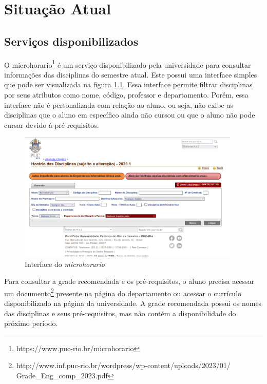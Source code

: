 
\chapter{Situa{\c c}\~ao Atual}
\label{cha:Situa{\c c}\~ao Atual}

\section{Serviços disponibilizados}

O microhorario\footnote{https://www.puc-rio.br/microhorario} é um serviço disponibilizado pela universidade para consultar informações das disciplinas do semestre atual. Este possui uma interface simples que pode ser visualizada na figura \ref{fig:microhorario}. Essa interface permite filtrar disciplinas por seus atributos como nome, código, professor e departamento. Porém, essa interface não é personalizada com relação ao aluno, ou seja, não exibe as disciplinas que o aluno em específico ainda não cursou ou que o aluno não pode cursar devido à pré-requisitos.

\begin{figure}[h]
    \begin{center}
    \includegraphics[width=300pt]{figuras/microhorario}
    \caption{Interface do \textit{microhorario}}
    \label{fig:microhorario}
    \end{center}
\end{figure}

Para consultar a grade recomendada e os pré-requisitos, o aluno precisa acessar um documento\footnote{http://www.inf.puc-rio.br/wordpress/wp-content/uploads/2023/01/\\Grade\_Eng\_comp\_2023.pdf} presente na página do departamento ou acessar o currículo disponibilizado na página da universidade. A grade recomendada possui os nomes das disciplinas e seus pré-requisitos, mas não contém a disponibilidade do próximo período.

